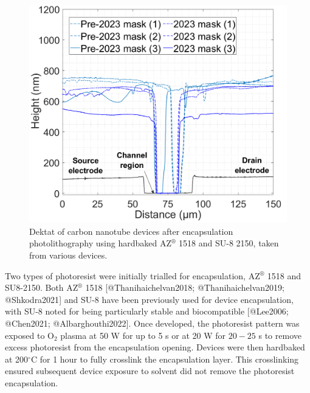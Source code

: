 \documentclass[
  letterpaper,
  DIV=11,
  numbers=noendperiod]{scrartcl}
\begin{document}
\begin{figure}
\begin{minipage}[t]{0.47\linewidth}
{{\includegraphics{figures/ch4/dektat_SU8_profile_comparison.png}

}

}

\end{minipage}%

\caption{\label{fig-dektat-encapsulation}Dektat of carbon nanotube
devices after encapsulation photolithography using hardbaked
AZ\(^\circledR\) 1518 and SU-8 2150, taken from various devices.}

\end{figure}

Two types of photoresist were initially trialled for encapsulation,
AZ\(^\circledR\) 1518 and SU8-2150. Both AZ\(^\circledR\) 1518
{[}@Thanihaichelvan2018; @Thanihaichelvan2019; @Shkodra2021{]} and SU-8
have been previously used for device encapsulation, with SU-8 noted for
being particularly stable and biocompatible {[}@Lee2006; @Chen2021;
@Albarghouthi2022{]}. Once developed, the photoresist pattern was
exposed to O\(_2\) plasma at 50 W for up to 5 s or at 20 W for \(20-25\)
s to remove excess photoresist from the encapsulation opening. Devices
were then hardbaked at 200\(^\circ\)C for 1 hour to fully crosslink the
encapsulation layer. This crosslinking ensured subsequent device
exposure to solvent did not remove the photoresist encapsulation.
\end{document}
